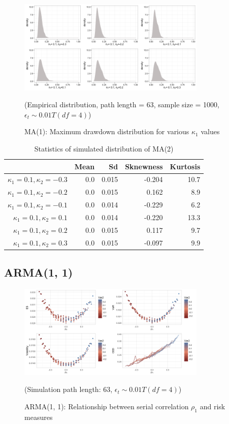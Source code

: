\documentclass[11pt]{article}
\begin{document}
\begin{figure}[H]
\centering
\includegraphics[width = 0.8\textwidth]{../figures/simulation/T_dist_MA2_maxDrawdown_dist_theta1_01}
\caption{MA(1): Maximum drawdown distribution for various $\kappa_1$ values }
(Empirical distribution, path length = 63, sample size = 1000, $\epsilon_t \sim 0.01T(df = 4)$)
\label{fig:T_dist_MA2_maxDrawdown_dist_theta1_01.png}
\end{figure}

\begin{table}[H]
\centering
\begin{tabular}{|r |r r r r|}
\hline
& Mean & Sd & Sknewness & Kurtosis \\
\hline
$\kappa_1 = 0.1, \kappa_2 = -0.3$ & 0.0 & 0.015 & -0.204 & 10.7\\
$\kappa_1 = 0.1, \kappa_2 = -0.2$ & 0.0 & 0.015 & 0.162 & 8.9\\
$\kappa_1 = 0.1, \kappa_2 = -0.1$ & 0.0 & 0.014 & -0.229 & 6.2\\
$\kappa_1 = 0.1, \kappa_2 = 0.1$ & 0.0 & 0.014 & -0.220 & 13.3\\
$\kappa_1 = 0.1, \kappa_2 = 0.2$ & 0.0 & 0.015 & 0.117 & 9.7\\
$\kappa_1 = 0.1, \kappa_2 = 0.3$ & 0.0 & 0.015 & -0.097 & 9.9\\
\hline
\end{tabular}
\caption{Statistics of simulated distribution of MA(2)}
\label{table: T_dist_MA2_return}
\end{table}

\subsection{ARMA(1, 1)}

\begin{figure}[H]
\centering
\includegraphics[width = 0.8\textwidth]{../figures/simulation/T_dist_AR1MA1_risk_measures}
\caption{ARMA(1, 1): Relationship between serial correlation $\rho_1$ and risk measures}
(Simulation path length: 63, $\epsilon_t \sim 0.01T(df = 4)$)
\label{fig:T_dist_AR1MA1_risk_measures}
\end{figure}
\end{document}
